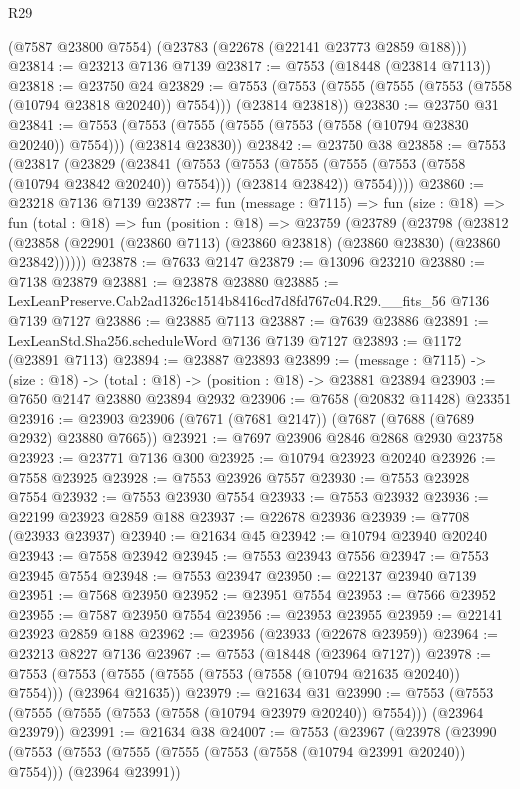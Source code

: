 \begin{lexlean}{R29}
\begin{coremodule}
    (@7587 @23800 @7554)
    (@23783 (@22678 (@22141 @23773 @2859 @188)))
@23814 := @23213 @7136 @7139
@23817 := @7553 (@18448 (@23814 @7113))
@23818 := @23750 @24
@23829 := @7553 (@7553 (@7555 (@7555 (@7553 (@7558 (@10794 @23818 @20240)) @7554))) (@23814 @23818))
@23830 := @23750 @31
@23841 := @7553 (@7553 (@7555 (@7555 (@7553 (@7558 (@10794 @23830 @20240)) @7554))) (@23814 @23830))
@23842 := @23750 @38
@23858 := @7553
    (@23817
      (@23829
        (@23841
          (@7553
            (@7553 (@7555 (@7555 (@7553 (@7558 (@10794 @23842 @20240)) @7554))) (@23814 @23842))
            @7554))))
@23860 := @23218 @7136 @7139
@23877 := fun (message : @7115) =>
  fun (size : @18) =>
  fun (total : @18) =>
  fun (position : @18) =>
  @23759
    (@23789
      (@23798
        (@23812 (@23858 (@22901 (@23860 @7113) (@23860 @23818) (@23860 @23830) (@23860 @23842))))))
@23878 := @7633 @2147
@23879 := @13096 @23210
@23880 := @7138 @23879
@23881 := @23878 @23880
@23885 := LexLeanPreserve.Cab2ad1326c1514b8416cd7d8fd767c04.R29.__fits_56 @7136 @7139 @7127
@23886 := @23885 @7113
@23887 := @7639 @23886
@23891 := LexLeanStd.Sha256.scheduleWord @7136 @7139 @7127
@23893 := @1172 (@23891 @7113)
@23894 := @23887 @23893
@23899 := (message : @7115) -> (size : @18) -> (total : @18) -> (position : @18) -> @23881 @23894
@23903 := @7650 @2147 @23880 @23894 @2932
@23906 := @7658 (@20832 @11428) @23351
@23916 := @23903 @23906 (@7671 (@7681 @2147)) (@7687 (@7688 (@7689 @2932) @23880 @7665))
@23921 := @7697 @23906 @2846 @2868 @2930 @23758
@23923 := @23771 @7136 @300
@23925 := @10794 @23923 @20240
@23926 := @7558 @23925
@23928 := @7553 @23926 @7557
@23930 := @7553 @23928 @7554
@23932 := @7553 @23930 @7554
@23933 := @7553 @23932
@23936 := @22199 @23923 @2859 @188
@23937 := @22678 @23936
@23939 := @7708 (@23933 @23937)
@23940 := @21634 @45
@23942 := @10794 @23940 @20240
@23943 := @7558 @23942
@23945 := @7553 @23943 @7556
@23947 := @7553 @23945 @7554
@23948 := @7553 @23947
@23950 := @22137 @23940 @7139
@23951 := @7568 @23950
@23952 := @23951 @7554
@23953 := @7566 @23952
@23955 := @7587 @23950 @7554
@23956 := @23953 @23955
@23959 := @22141 @23923 @2859 @188
@23962 := @23956 (@23933 (@22678 @23959))
@23964 := @23213 @8227 @7136
@23967 := @7553 (@18448 (@23964 @7127))
@23978 := @7553 (@7553 (@7555 (@7555 (@7553 (@7558 (@10794 @21635 @20240)) @7554))) (@23964 @21635))
@23979 := @21634 @31
@23990 := @7553 (@7553 (@7555 (@7555 (@7553 (@7558 (@10794 @23979 @20240)) @7554))) (@23964 @23979))
@23991 := @21634 @38
@24007 := @7553
    (@23967
      (@23978
        (@23990
          (@7553
            (@7553 (@7555 (@7555 (@7553 (@7558 (@10794 @23991 @20240)) @7554))) (@23964 @23991))

\end{coremodule}
\end{lexlean}
